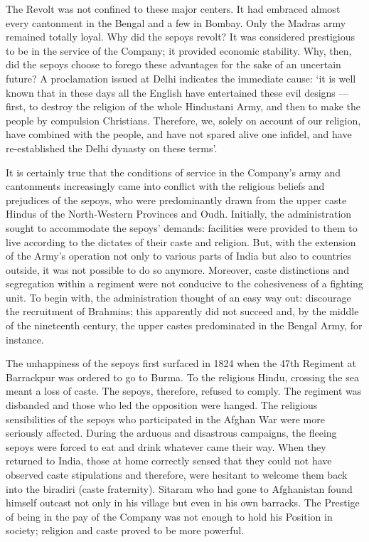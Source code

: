The Revolt was not confined to these major centers. It had embraced almost every cantonment in the Bengal and a few in Bombay. Only the Madras army remained totally loyal. Why did the sepoys revolt? It was considered prestigious to be in the service of the Company; it provided economic stability. Why, then, did the sepoys choose to forego these advantages for the sake of an uncertain future? A proclamation issued at Delhi indicates the immediate cause: `it is well known that in these days all the English have entertained these evil designs --- first, to destroy the religion of the whole Hindustani Army, and then to make the people by compulsion Christians. Therefore, we, solely on account of our religion, have combined with the people, and have not spared alive one infidel, and have re-established the Delhi dynasty on these terms'.

It is certainly true that the conditions of service in the Company's army and cantonments increasingly came into conflict with the religious beliefs and prejudices of the sepoys, who were predominantly drawn from the upper caste Hindus of the North-Western Provinces and Oudh. Initially, the administration sought to accommodate the sepoys' demands: facilities were provided to them to live according to the dictates of their caste and religion. But, with the extension of the Army's operation not only to various parts of India but also to countries outside, it was not possible to do so anymore. Moreover, caste distinctions and segregation within a regiment were not conducive to the cohesiveness of a fighting unit. To begin with, the administration thought of an easy way out: discourage the recruitment of Brahmins; this apparently did not succeed and, by the middle of the nineteenth century, the upper castes predominated in the Bengal Army, for instance.

The unhappiness of the sepoys first surfaced in 1824 when the 47th Regiment at Barrackpur was ordered to go to Burma. To the religious Hindu, crossing the sea meant a loss of caste. The sepoys, therefore, refused to comply. The regiment was disbanded and those who led the opposition were hanged. The religious sensibilities of the sepoys who participated in the Afghan War were more seriously affected. During the arduous and disastrous campaigns, the fleeing sepoys were forced to eat and drink whatever came their way. When they returned to India, those at home correctly sensed that they could not have observed caste stipulations and therefore, were hesitant to welcome them back into the biradiri (caste fraternity). Sitaram who had gone to Afghanistan found himself outcast not only in his village but even in his own barracks. The Prestige of being in the pay of the Company was not enough to hold his Position in society; religion and caste proved to be more powerful.

